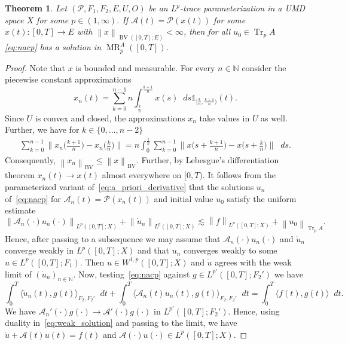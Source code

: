 \documentclass[reqno,a4paper,final]{amsart}
\numberwithin{equation}{section}
\newtheorem{theorem}[lemma]{Theorem}
\theoremstyle{definition}
\begin{document}
	\begin{theorem}\label{thm:existence}
		Let $(\mathcal{P}, F_1 , F_2, E, U, O)$ be an $L^p$-trace parameterization in a UMD space $X$ for some $p \in (1, \infty)$. If $\mathcal{A}(t) = \mathcal{P}(x(t))$ for some $x(t)\colon [0,T] \to E$ with ${\left\lVert{x}\right\rVert}_{\operatorname{BV}([0,T];E)} < \infty$, then for all $u_0 \in \operatorname{Tr}_p A$ \eqref{eq:nacp} has a solution in $\operatorname{MR}_p^A([0,T])$.
	\end{theorem}
	\begin{proof}
		Note that $x$ is bounded and measurable. For every $n \in {\mathbb{N}}$ consider the piecewise constant approximations 
		\begin{equation*}
			x_n(t) = \sum_{k=0}^{n-1} n \int_{\frac{k}{n}}^{\frac{k+1}{n}} x(s) {\mathop{}\!d} s \mathds{1}_{[\frac{k}{n}, \frac{k+1}{n})}(t).
		\end{equation*}
		Since $U$ is convex and closed, the approximations $x_n$ take values in $U$ as well. Further, we have for $k \in \{0, \ldots, n-2\}$ 
		\begin{align*}
			\sum_{k=0}^{n-1} {\biggl\lVert{x_n\biggl(\frac{k+1}{n}\biggr) - x_n \biggl(\frac{k}{n} \biggr)}\biggr\rVert} = n \int_0^{\frac{1}{n}} \sum_{k=0}^{n-1} {\biggl\lVert{x \biggl(s+\frac{k+1}{n}\biggr) - x \biggl(s+\frac{k}{n}\biggr)}\biggr\rVert} {\mathop{}\!d} s.
		\end{align*}
		Consequently, ${\left\lVert{x_n}\right\rVert}_\operatorname{BV} \le {\left\lVert{x}\right\rVert}_\operatorname{BV}$. Further, by Lebesgue's differentiation theorem $x_n(t) \to x(t)$ almost everywhere on $[0,T)$. It follows from the parameterized variant of~\eqref{eq:a_priori_derivative} that the solutions $u_n$ of~\eqref{eq:nacp} for $\mathcal{A}_n(t) = \mathcal{P}(x_n(t))$ and initial value $u_0$ satisfy the uniform estimate
		\begin{equation*}
			{\left\lVert{\mathcal{A}_n(\cdot) u_n(\cdot)}\right\rVert}_{L^p([0,T];X)} + {\left\lVert{\dot{u}_n}\right\rVert}_{L^p([0,T];X)} \lesssim {\left\lVert{f}\right\rVert}_{L^p([0,T];X)} + {\left\lVert{u_0}\right\rVert}_{\operatorname{Tr}_p A}.
		\end{equation*}
		Hence, after passing to a subsequence we may assume that $\mathcal{A}_n(\cdot) u_n(\cdot)$ and $\dot{u}_n$ converge weakly in $L^p([0,T];X)$ and that $u_n$ converges weakly to some $u \in L^p([0,T];F_1)$. Then $u \in W^{1,p}([0,T];X)$ and $\dot{u}$ agrees with the weak limit of $(\dot{u}_n)_{n \in {\mathbb{N}}}$. Now, testing~\eqref{eq:nacp} against $g \in L^{p'}([0,T];F_2')$ we have 
		\begin{equation}
			\label{eq:weak_solution}
			\int_0^T \langle \dot{u}_n(t), g(t) \rangle_{F_2, F_2'} {\mathop{}\!d} t + \int_0^T \langle \mathcal{A}_n(t) u_n(t), g(t) \rangle_{F_2, F_2'} {\mathop{}\!d} t = \int_0^T \langle f(t), g(t) \rangle {\mathop{}\!d} t.
		\end{equation}
		We have $\mathcal{A}_n'(\cdot) g(\cdot) \to \mathcal{A}'(\cdot) g(\cdot)$ in $L^{p'}([0,T];F_2')$. Hence, using duality in~\eqref{eq:weak_solution} and passing to the limit, we have $\dot{u} + \mathcal{A}(t)u(t) = f(t)$ and $\mathcal{A}(\cdot)u(\cdot) \in L^p([0,T];X)$.
	\end{proof}
	
\end{document}
